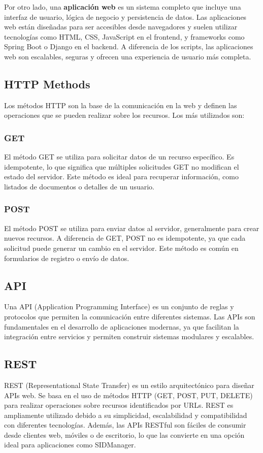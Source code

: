 \documentclass[draft]{scrbook}
\begin{document}
Por otro lado, una \textbf{aplicación web}  es un sistema completo que incluye una interfaz de usuario, lógica de negocio y persistencia de datos. Las aplicaciones web están diseñadas para ser accesibles desde navegadores y suelen utilizar tecnologías como HTML, CSS, JavaScript en el frontend, y frameworks como Spring Boot o Django en el backend. A diferencia de los scripts, las aplicaciones web son escalables, seguras y ofrecen una experiencia de usuario más completa.

\subsection{HTTP Methods}
 Los métodos HTTP son la base de la comunicación en la web y definen las operaciones que se pueden realizar sobre los recursos. Los más utilizados son:

\subsubsection{GET}
El método GET se utiliza para solicitar datos de un recurso específico. Es idempotente, lo que significa que múltiples solicitudes GET no modifican el estado del servidor. Este método es ideal para recuperar información, como listados de documentos o detalles de un usuario.

\subsubsection{POST}
El método POST se utiliza para enviar datos al servidor, generalmente para crear nuevos recursos. A diferencia de GET, POST no es idempotente, ya que cada solicitud puede generar un cambio en el servidor. Este método es común en formularios de registro o envío de datos.

\subsection{API}
 Una API (Application Programming Interface) es un conjunto de reglas y protocolos que permiten la comunicación entre diferentes sistemas. Las APIs son fundamentales en el desarrollo de aplicaciones modernas, ya que facilitan la integración entre servicios y permiten construir sistemas modulares y escalables.

\subsection{REST}
REST (Representational State Transfer) es un estilo arquitectónico para diseñar APIs web. Se basa en el uso de métodos HTTP (GET, POST, PUT, DELETE) para realizar operaciones sobre recursos identificados por URLs. REST es ampliamente utilizado debido a su simplicidad, escalabilidad y compatibilidad con diferentes tecnologías. Además, las APIs RESTful son fáciles de consumir desde clientes web, móviles o de escritorio, lo que las convierte en una opción ideal para aplicaciones como SIDManager.
\end{document}
